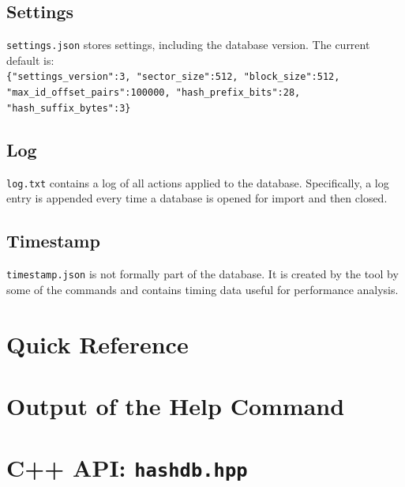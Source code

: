\documentclass[11pt,fleqn]{article} %
\begin{document}
\subsection{Settings}
\verb+settings.json+ stores \hdb settings, including the database version.  The current default is:\\
\verb+{"settings_version":3, "sector_size":512, "block_size":512,+\\
\verb+"max_id_offset_pairs":100000, "hash_prefix_bits":28, "hash_suffix_bytes":3}+

\subsection{Log}
\verb+log.txt+ contains a log of all actions applied to the database.  Specifically, a log entry is appended every time a database is opened for import and then closed.

\subsection{Timestamp}
\verb+timestamp.json+ is not formally part of the \hdb database.  It is created by the \hdb tool by some of the \hdb commands and contains timing data useful for performance analysis.

 


\newpage
\appendix
\appendixpage

\section{\hdb Quick Reference}
\label{QuickReference}

\newpage

\section{Output of the \hdb Help Command}
\label{HelpOutput}
\begingroup
\footnotesize
{
\selectfont

}
\endgroup


\section{\hdb C++ API: \texttt{hashdb.hpp}}
\label{hashdbapi}
\lstset{language=C++}
\lstset{basicstyle=\footnotesize}
\lstset{breaklines=true}
\lstset{breakatwhitespace=true}

\end{document}
